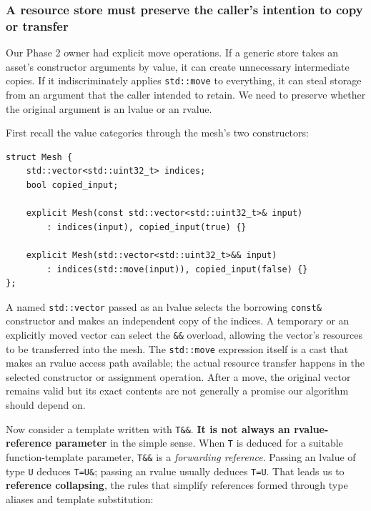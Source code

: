 \subsubsection{A resource store must preserve the caller's intention to copy or transfer}\label{a-resource-store-must-preserve-the-callers-intention-to-copy-or-transfer}

Our Phase 2 owner had explicit move operations. If a generic store takes an asset's constructor arguments by value, it can create unnecessary intermediate copies. If it indiscriminately applies \texttt{std::move} to everything, it can steal storage from an argument that the caller intended to retain. We need to preserve whether the original argument is an lvalue or an rvalue.

First recall the value categories through the mesh's two constructors:

\begin{verbatim}
struct Mesh {
    std::vector<std::uint32_t> indices;
    bool copied_input;

    explicit Mesh(const std::vector<std::uint32_t>& input)
        : indices(input), copied_input(true) {}

    explicit Mesh(std::vector<std::uint32_t>&& input)
        : indices(std::move(input)), copied_input(false) {}
};
\end{verbatim}

A named \texttt{std::vector} passed as an lvalue selects the borrowing \texttt{const\&} constructor and makes an independent copy of the indices. A temporary or an explicitly moved vector can select the \texttt{\&\&} overload, allowing the vector's resources to be transferred into the mesh. The \texttt{std::move} expression itself is a cast that makes an rvalue access path available; the actual resource transfer happens in the selected constructor or assignment operation. After a move, the original vector remains valid but its exact contents are not generally a promise our algorithm should depend on.

Now consider a template written with \texttt{T\&\&}. \textbf{It is not always an rvalue-reference parameter} in the simple sense. When \texttt{T} is deduced for a suitable function-template parameter, \texttt{T\&\&} is a \emph{forwarding reference}. Passing an lvalue of type \texttt{U} deduces \texttt{T=U\&}; passing an rvalue usually deduces \texttt{T=U}. That leads us to \textbf{reference collapsing}, the rules that simplify references formed through type aliases and template substitution:

